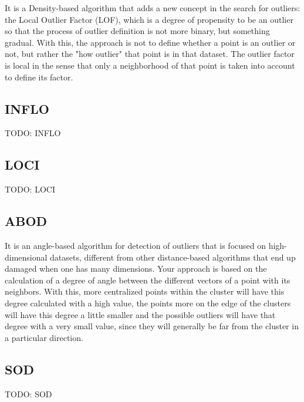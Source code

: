 It is a Density-based algorithm that adds a new concept in the search for outliers: the
Local Outlier Factor (LOF), which is a degree of propensity to be an outlier so that the
process of outlier definition is not more binary, but something gradual. With this, the
approach is not to define whether a point is an outlier or not, but rather the "how outlier"
that point is in that dataset. The outlier factor is local in the sense that only a neighborhood
of that point is taken into account to define its factor.

\subsection{INFLO}

TODO: INFLO

\subsection{LOCI}

TODO: LOCI

\subsection{ABOD}

It is an angle-based algorithm for detection of outliers that is focused on high-dimensional
datasets, different from other distance-based algorithms that end up damaged when one has
many dimensions. Your approach is based on the calculation of a degree of angle between the
different vectors of a point with its neighbors. With this, more centralized points within
the cluster will have this degree calculated with a high value, the points more on the edge
of the clusters will have this degree a little smaller and the possible outliers will have
that degree with a very small value, since they will generally be far from the cluster in a
particular direction.

\subsection{SOD}

TODO: SOD